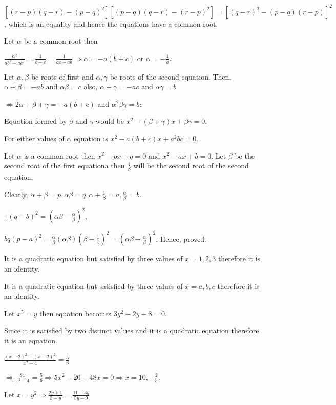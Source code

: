   $[(r - p)(q - r) - (p - q)^2][(p - q)(q - r) - (r - p)^2] = [(q - r)^2 - (p - q)(r - p)]^2$, which is an
  equality and hence the equations have a common root.
\item Let $\alpha$ be a common root then

  $\frac{\alpha^2}{ab^2 - ac^2} = \frac{1}{b - c} = \frac{1}{ac - ab}\Rightarrow \alpha = -a(b + c)$ or
  $\alpha = -\frac{1}{a}$.

  Let $\alpha, \beta$ be roots of first and $\alpha, \gamma$ be roots of the second equation. Then,
  $\alpha + \beta = -ab$ and $\alpha\beta = c$ also, $\alpha + \gamma = -ac$ and
  $\alpha\gamma = b$

  $\Rightarrow 2\alpha + \beta + \gamma = -a(b + c)$ and $\alpha^2\beta\gamma = bc$

  Equation formed by $\beta$ and $\gamma$ would be $x^2 - (\beta + \gamma)x + \beta\gamma = 0$.

  For either values of $\alpha$ equation is $x^2 - a(b + c)x + a^2bc = 0$.
\item Let $\alpha$ is a common root then $x^2 - px + q = 0$ and $x^2 - ax + b = 0$. Let $\beta$ be the
  second root of the first equationa then $\frac{1}{\beta}$ will be the second root of the second equation.

  Clearly, $\alpha + \beta = p, \alpha\beta = q, \alpha + \frac{1}{\beta} = a, \frac{\alpha}{\beta} = b$.

  $\therefore (q - b)^2 = (\alpha\beta - \frac{\alpha}{\beta})^2$,

  $bq(p - a)^2 = \frac{\alpha}{\beta}(\alpha\beta)(\beta - \frac{1}{\beta})^2 = (\alpha\beta -
  \frac{\alpha}{\beta})^2$. Hence, proved.
\item It is a quadratic equation but satisfied by three values of $x = 1, 2, 3$ therefore it is an
  identity.
\item It is a quadratic equation but satisfied by three values of $x = a, b, c$ therefore it is an
  identity.
\item Let $x^5 = y$ then equation becomes $3y^2 - 2y - 8 = 0$.

  Since it is satisfied by two distinct values and it is a quadratic equation therefore it is an
  equation.
\item $\frac{(x + 2)^2 - (x - 2)^2}{x^2 - 4} = \frac{5}{6}$

  $\Rightarrow \frac{8x}{x^2 - 4} = \frac{5}{6}\Rightarrow 5x^2 - 20 - 48x = 0\Rightarrow x = 10 ,
  -\frac{2}{5}$.
\item Let $x = y^2\Rightarrow \frac{2y + 1}{3 - y} = \frac{11 - 3y}{5y - 9}$

